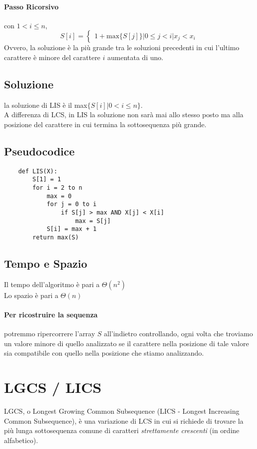 \paragraph*{Passo Ricorsivo} con $1<i\leq n$,
$$
S[i] = \begin{cases}
	1+\text{max}\{S[j]\} | 0 \leq j < i | x_j < x_i
\end{cases}
$$
Ovvero, la soluzione è la più grande tra le soluzioni precedenti in cui l'ultimo carattere è minore del carattere $i$ aumentata di uno.
\subsection*{Soluzione}
la soluzione di LIS è il max$\{S[i]| 0 < i \leq n\}$.
\\A differenza di LCS, in LIS la soluzione non sarà mai allo stesso posto ma alla posizione del carattere in cui termina la sottosequenza più grande.
\subsection*{Pseudocodice}
\begin{lstlisting}
	def LIS(X):
		S[1] = 1
		for i = 2 to n
			max = 0
			for j = 0 to i
				if S[j] > max AND X[j] < X[i]
					max = S[j]
			S[i] = max + 1
		return max(S) 

\end{lstlisting}

\subsection*{Tempo e Spazio}
Il tempo dell'algoritmo è pari a $\Theta(n^2)$
\\Lo spazio è pari a $\Theta(n)$

\paragraph*{Per ricostruire la sequenza} potremmo ripercorrere l'array $S$ all'indietro controllando,
ogni volta che troviamo un valore minore di quello analizzato se il carattere nella posizione di tale valore sia compatibile con quello nella posizione che stiamo analizzando.


\section{LGCS / LICS} %
LGCS, o Longest Growing Common Subsequence (LICS - Longest Increasing Common Subsequence), è una variazione di LCS in cui si richiede
di trovare la più lunga sottosequenza comune di caratteri \emph{strettamente crescenti} (in ordine alfabetico).

